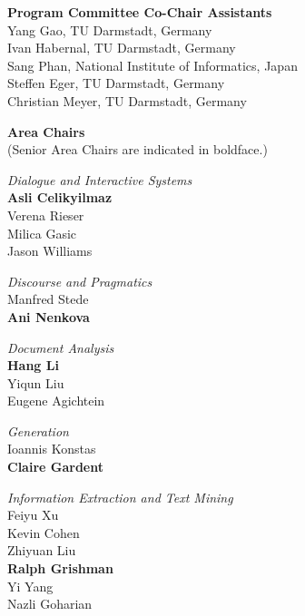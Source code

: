 {\bf Program Committee Co-Chair Assistants} \\
Yang Gao, TU Darmstadt, Germany \\
Ivan Habernal, TU Darmstadt, Germany \\
Sang Phan, National Institute of Informatics, Japan \\
Steffen Eger, TU Darmstadt, Germany \\
Christian Meyer, TU Darmstadt, Germany

{\bf Area Chairs} \\
(Senior Area Chairs are indicated in boldface.)

\emph{Dialogue and Interactive Systems} \\
\hspace*{5mm}\textbf{Asli Celikyilmaz} \\
\hspace*{5mm}Verena Rieser \\
\hspace*{5mm}Milica Gasic \\
\hspace*{5mm}Jason Williams

\emph{Discourse and Pragmatics} \\
\hspace*{5mm}Manfred Stede \\
\hspace*{5mm}\textbf{Ani Nenkova}

\emph{Document Analysis} \\
\hspace*{5mm}\textbf{Hang Li} \\
\hspace*{5mm}Yiqun Liu \\
\hspace*{5mm}Eugene Agichtein

\emph{Generation} \\
\hspace*{5mm}Ioannis Konstas \\
\hspace*{5mm}\textbf{Claire Gardent}

\emph{Information Extraction and Text Mining} \\
\hspace*{5mm}Feiyu Xu \\
\hspace*{5mm}Kevin Cohen \\
\hspace*{5mm}Zhiyuan Liu \\
\hspace*{5mm}\textbf{Ralph Grishman} \\
\hspace*{5mm}Yi Yang \\
\hspace*{5mm}Nazli Goharian

